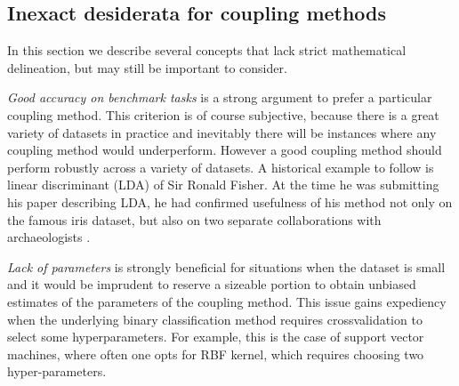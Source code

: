 %


\subsection{Inexact desiderata for coupling methods}

\label{sec:des:inexact}

In this section we describe several concepts that lack strict mathematical delineation, but may still be important to consider.

\emph{Good accuracy on benchmark tasks} is  a strong argument to prefer a particular coupling method. This criterion is of course subjective, because there is a great variety of datasets in practice and inevitably there will be instances where any coupling method would underperform. However a good coupling method should perform robustly across a variety of datasets. A historical  example to follow is linear discriminant (LDA) of  Sir Ronald Fisher. At the time he was submitting his paper describing LDA, he had confirmed usefulness of his method not only on the famous iris dataset, but also on two separate collaborations with archaeologists \cite{barnard1935secular, martin1936study}. 

\emph{Lack of parameters} is strongly beneficial for situations when the dataset is small and it would be imprudent to reserve a sizeable portion to obtain unbiased estimates of the parameters of the coupling method. This issue gains expediency when the underlying binary classification method requires crossvalidation to select some hyperparameters. For example, this is the case of support vector machines, where often one opts for RBF kernel, which requires choosing two hyper-parameters. 

